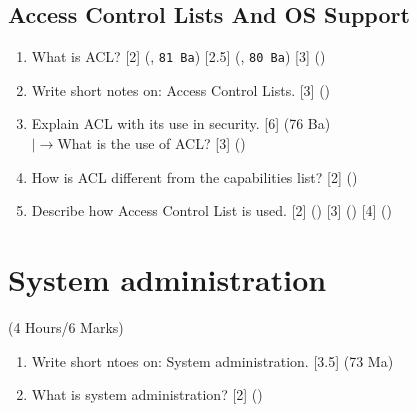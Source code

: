 \documentclass[12pt]{article}
\newcommand{\lb}{\\$\left|\rightarrow\right.$}
\begin{document}
	\subsection{Access Control Lists And OS Support}
		\begin{enumerate}
			\item What is ACL? \hfill [2] (, \texttt{81 Ba}) [2.5] (, \texttt{80 Ba}) [3] ()

			\item Write short notes on: Access Control Lists. \hfill [3] ()

			\item Explain ACL with its use in security. \hfill [6] (76 Ba)
			\lb What is the use of ACL? \hfill [3] ()

			\item How is ACL different from the capabilities list? \hfill [2] ()

			\item Describe how Access Control List is used. \hfill [2] () [3] () [4] ()
		\end{enumerate}

	\pagebreak

\section{System administration}
	\begin{center}(4 Hours/6 Marks)\end{center}
	
	\begin{enumerate}[noitemsep, topsep=0pt]
		\item Write short ntoes on: System administration. \hfill [3.5] (73 Ma)

		\item What is system administration? \hfill [2] ()
	\end{enumerate}
\end{document}
